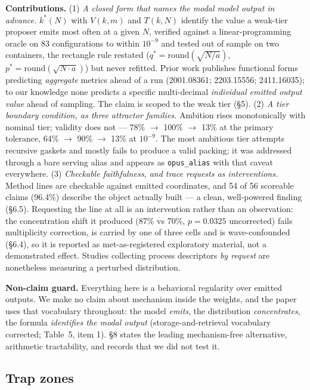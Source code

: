\documentclass[11pt]{article}
\begin{document}
\textbf{Contributions.} (1) \textit{A closed form that names the modal model output in advance.} $k^{*}(N)$ with
$V(k, m)$ and $T(k, N)$ identify the value a weak-tier proposer emits most often at a given $N$,
verified against a linear-programming oracle on 83 configurations to within $10^{-9}$ and tested out
of sample on two containers, the rectangle rule restated ($q^{*} = \mathrm{round}(\sqrt{N/a})$,
$p^{*} = \mathrm{round}(\sqrt{N \cdot a})$) but never refitted. Prior work publishes functional forms predicting
\textit{aggregate} metrics ahead of a run (2001.08361; 2203.15556; 2411.16035); to our knowledge none
predicts a specific multi-decimal \textit{individual emitted output value} ahead of sampling. The claim
is scoped to the weak tier (\S5). (2) \textit{A tier boundary condition, as three attractor families.}
Ambition rises monotonically with nominal tier; validity does not --- 78\% $\rightarrow$ 100\% $\rightarrow$ 13\% at the
primary tolerance, 64\% $\rightarrow$ 90\% $\rightarrow$ 13\% at $10^{-9}$. The most ambitious tier attempts recursive gaskets
and mostly fails to produce a valid packing; it was addressed through a bare serving alias and
appears as \texttt{opus\_alias} with that caveat everywhere. (3) \textit{Checkable faithfulness, and trace
requests as interventions.} Method lines are checkable against emitted coordinates, and 54 of
56 scoreable claims (96.4\%) describe the object actually built --- a clean, well-powered finding
(\S6.5). Requesting the line at all is an intervention rather than an observation: the
concentration shift it produced (87\% vs 70\%, $p = 0.0325$ uncorrected) fails multiplicity
correction, is carried by one of three cells and is wave-confounded (\S6.4), so it is reported
as met-as-registered exploratory material, not a demonstrated effect. Studies collecting
process descriptors \textit{by request} are nonetheless measuring a perturbed distribution.

\textbf{Non-claim guard.} Everything here is a behavioral regularity over emitted outputs. We make
no claim about mechanism inside the weights, and the paper uses that vocabulary throughout: the
model \textit{emits}, the distribution \textit{concentrates}, the formula \textit{identifies the modal output}
(storage-and-retrieval vocabulary corrected; Table~5, item 1). \S8 states the leading
mechanism-free alternative, arithmetic tractability, and records that we did not test it.

\subsection{Trap zones}
\end{document}
